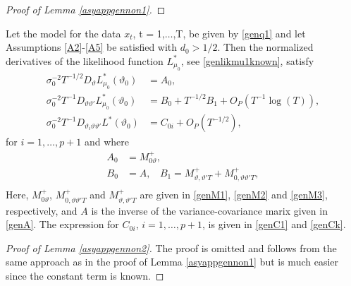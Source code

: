 {{\begin{proof}[Proof of Lemma \ref{asyappgennon1}]
  

\end{proof}



















\begin{lemma} \label{asyappgennon2}
Let the model for the data $x_t$, t = 1,$\ldots$,T, be given by \eqref{genq1} and let Assumptions \ref{A2}-\ref{A5} be satisfied with $d_0 > 1/2$. Then the normalized derivatives of the likelihood function $L_{\mu_0}^*$, see \eqref{genlikmu1known}, satisfy
\begin{align}
    \sigma_0^{-2} T^{-1/2} D_{\vartheta} L_{\mu_0}^*(\vartheta_0)  &= A_{0}, \\
    \sigma_0^{-2} T^{-1} D_{\vartheta \vartheta'} L_{\mu_0}^* (\vartheta_0)  &= B_{0} + T^{-1/2}  B_{1} + O_P(T^{-1} \log(T) ), \\
    \sigma_0^{-2} T^{-1} D_{\vartheta_i \vartheta \vartheta'} L^*(\vartheta_0)  &= C_{0i} + O_P(T^{-1/2}),
\end{align}
for $i = 1,\ldots,p+1$ and where
\begin{align*}
A_{0} &= M_{0\vartheta}^{+},\\
B_{0} &= A, \ \ \ \ B_1 = M_{\vartheta,\vartheta' T}^{+} + M_{0,\vartheta \vartheta' T}^{+}, \\
\end{align*}
Here,
$M_{0\vartheta}^{+}$, $M_{0,\vartheta \vartheta' T}^{+}$ and $M_{\vartheta,\vartheta' T}^{+}$ are given in \eqref{genM1}, \eqref{genM2} and \eqref{genM3}, respectively,
and $A$ is the inverse of the variance-covariance marix given in \eqref{genA}. The expression for $C_{0i}$, $i = 1,\ldots,p+1$, is given in \eqref{genC1} and \eqref{genCk}. 
\end{lemma}

\begin{proof}[Proof of Lemma \ref{asyappgennon2}]
The proof is omitted and follows from the same approach as in the proof of Lemma  \ref{asyappgennon1} but is much easier since the constant term is known. 
\end{proof}


}}
